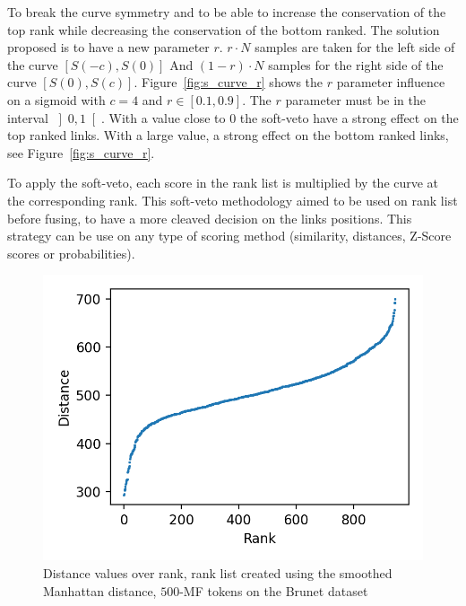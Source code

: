 To break the curve symmetry and to be able to increase the conservation of the top rank while decreasing the conservation of the bottom ranked.
The solution proposed is to have a new parameter $r$.
$r \cdot N$ samples are taken for the left side of the curve $\left[S(-c), S(0)\right]$
And $(1-r) \cdot N$ samples for the right side of the curve $\left[S(0), S(c)\right]$.
Figure~\ref{fig:s_curve_r} shows the $r$ parameter influence on a sigmoid with $c = 4$ and $r \in \left[0.1, 0.9\right]$.
The $r$ parameter must be in the interval $\left]0, 1\right[$.
With a value close to $0$ the soft-veto have a strong effect on the top ranked links.
With a large value, a strong effect on the bottom ranked links, see Figure~\ref{fig:s_curve_r}.

To apply the soft-veto, each score in the rank list is multiplied by the curve at the corresponding rank.
This soft-veto methodology aimed to be used on rank list before fusing, to have a more cleaved decision on the links positions.
This strategy can be use on any type of scoring method (similarity, distances, Z-Score scores or probabilities).

\begin{figure}[!t]
  \centering
  \caption{Distance values over rank, rank list created using the smoothed Manhattan distance, $500$-MF tokens on the Brunet dataset}
  \label{fig:distance_over_rank}
  \includegraphics[width=\linewidth]{img/distance_over_rank.png}
\end{figure}


